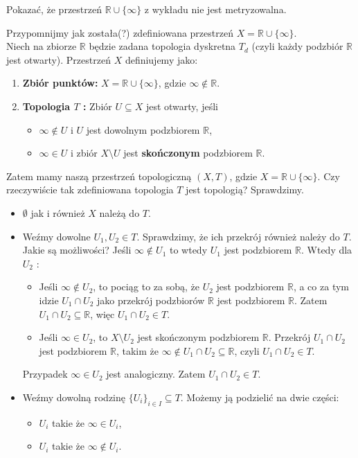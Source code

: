 \begin{problem}[5]
	Pokazać, że przestrzeń $\mathbb{R}\cup \{\infty\} $ z wykładu nie jest metryzowalna. 
\end{problem} 
Przypomnijmy jak została(?) zdefiniowana przestrzeń $X = \mathbb{R}\cup \{\infty\} $.\\
Niech na zbiorze $\mathbb{R}$ będzie zadana topologia dyskretna $T_{d}$ (czyli każdy podzbiór $\mathbb{R}$ jest otwarty). Przestrzeń $X$ definiujemy jako:
\begin{enumerate}[label=\arabic*)]
	\item \textbf{Zbiór punktów:} $X = \mathbb{R}\cup \{\infty\} $, gdzie $\infty \not\in \mathbb{R}$.
	\item \textbf{Topologia $T$ :} Zbiór $U\subseteq X$ jest otwarty, jeśli
		\begin{itemize}
			\item $\infty \not\in U$ i $U$ jest dowolnym podzbiorem $\mathbb{R}$,
			\item $\infty \in U$ i zbiór $X\setminus U$ jest \textbf{skończonym} podzbiorem $\mathbb{R}$.
		\end{itemize}
\end{enumerate}
\noindent Zatem mamy naszą przestrzeń topologiczną $\left( X,T \right) $, gdzie $X = \mathbb{R}\cup \{ \infty\} $. Czy rzeczywiście tak zdefiniowana topologia $T$ jest topologią? Sprawdzimy.\\
\begin{itemize}
	\item $\emptyset$ jak i również $X$ należą do $T$.
	\item Weźmy dowolne $U_1, U_2 \in T$. Sprawdzimy, że ich przekrój również należy do $T$. Jakie są możliwości? Jeśli $\infty \not\in  U_1$ to wtedy  $U_1$ jest podzbiorem $\mathbb{R}$. Wtedy dla $U_2$ :
		\begin{itemize}
			\item Jeśli $\infty \not\in  U_2$, to pociąg to za sobą, że $U_2$ jest podzbiorem $\mathbb{R}$, a co za tym idzie $U_1\cap U_2$ jako przekrój podzbiorów $\mathbb{R}$ jest podzbiorem $\mathbb{R}$. Zatem $U_1\cap U_2 \subseteq \mathbb{R}$, więc $U_1\cap U_2 \in T$.
			\item Jeśli $\infty \in U_2$, to $X\setminus U_2$ jest skończonym podzbiorem $\mathbb{R}$. Przekrój $U_1\cap U_2$ jest podzbiorem $\mathbb{R}$, takim że $\infty\not\in U_1\cap U_2 \subseteq \mathbb{R}$, czyli $U_1\cap U_2 \in T$.
		\end{itemize}
	Przypadek $\infty\in U_2$ jest analogiczny. Zatem $U_1\cap U_2 \in T$.
	\item Weźmy dowolną rodzinę $\{U_{i}\}_{i \in I} \subseteq T$. Możemy ją podzielić na dwie części: 
		\begin{itemize}
			\item $U_{i}$ takie że $\infty \in U_{i}$,
			\item $U_{i}$ takie że $\infty \not\in U_{i}$.
		\end{itemize}
\end{itemize}
